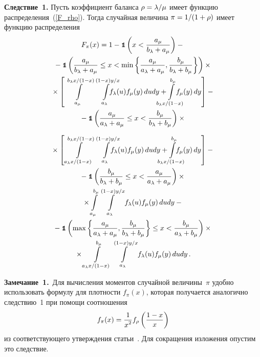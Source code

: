 \begin{multicols}{2}
\noindent
\textbf{Следствие~1.} 
Пусть коэффициент баланса $\rho\hm=\lambda/\mu$ имеет функцию распределения~(\ref{F_rho}). 
Тогда случайная величина $\pi\hm=1/(1\hm+\rho)$ имеет функцию распределения
\begin{multline*}
F_\pi(x)=1-\Ik\left(x<\fr{a_\mu}{b_\lambda+a_\mu}\right)-{}\\
{}-\Ik\left(\fr{a_\mu}{b_\lambda+a_\mu}\le x<\min\left\{\fr{a_\mu}{a_\lambda+a_\mu},
\fr{b_\mu}{b_\lambda+b_\mu}\right\}\right)\times{}\\
{}\times\left[\,
\il{a_\mu}{{b_\lambda x}/({1-x})}
\il{a_\lambda}{({1-x})y/{x}}\hspace*{-5mm}\fl(u)\fm(y)\, dudy+\hspace*{-5mm}
\il{{b_\lambda x}/({1-x})}{b_\mu}\hspace*{-5mm}\fm(y)\, dy\right]-{}\\
{}-\Ik\left(\fr{a_\mu}{a_\lambda+a_\mu}\le x<\fr{b_\mu}{b_\lambda+b_\mu}\right)\times{}
\end{multline*}

\noindent
\begin{multline*}
{}\times\left[ \,
\il{{a_\lambda x}/({1-x})}{{b_\lambda x}/({1-x})}
\il{a_\lambda}{({1-x})y/{x}}\hspace*{-13pt}\fl(u)\fm(y)\, dudy +\hspace*{-14pt}
\il{{b_\lambda x}/({1-x})}{b_\mu}\hspace*{-16pt}\fm(y)\, dy\right]-{}\\
{}-\Ik\left(\fr{b_\mu}{b_\lambda+b_\mu}\le x<\fr{a_\mu}{a_\lambda+a_\mu}\right)\times{}\\
{}\times
\il{a_\mu}{b_\mu}
\il{a_\lambda}{({1-x})y/{x}}\fl(u)\fm(y)\, dudy-{}\\
{}-\Ik\left(\max\left\{\fr{a_\mu}{a_\lambda+a_\mu},\frac{b_\mu}{b_\lambda+b_\mu}\right\}\le 
x<\fr{b_\mu}{a_\lambda+b_\mu}\right)\times{}\\
{}\times
\il{{a_\lambda x}/({1-x})}{b_\mu}
\il{a_\lambda}{({1-x})y/{x}}\fl(u)\fm(y)\, dudy\,.
\end{multline*}


\noindent
\textbf{Замечание~1.}\ Для вычисления моментов случайной величины~$\pi$ удобно 
использовать формулу для плотности $f_\pi(x)$, которая получается 
аналогично следствию~1 при помощи соотношения
$$
f_\pi(x)=\displaystyle\frac{\displaystyle 1\mathstrut}{\displaystyle x^2\mathstrut}f_\rho\left(\displaystyle\frac{\displaystyle 1-x\mathstrut}{\displaystyle x\mathstrut}\right)
$$
из соответствующего утверждения статьи~\cite{K2016}. Для сокращения изложения 
опустим это следствие.

\smallskip


\end{multicols}
